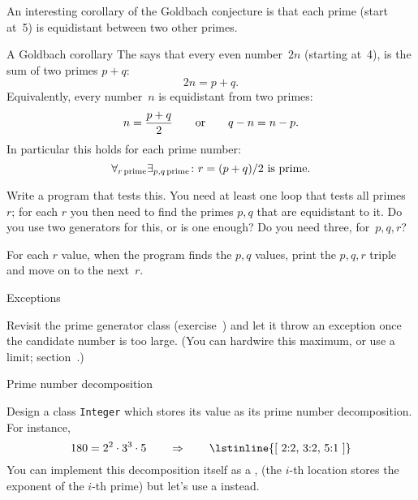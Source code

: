 An interesting corollary of the Goldbach conjecture is that
each prime (start at~5) is equidistant between two other primes.

\begin{block}{A Goldbach corollary}
  \label{sl:goldbach-pqr}
  The  says that every even number~$2n$
  (starting at~4), is the sum of two primes $p+q$: \[ 2n=p+q.\]
  Equivalently, every number~$n$ is equidistant from two primes:
  \[ n=\frac{p+q}2\qquad\hbox{or}\qquad q-n = n-p.\]
  In particular this holds for each prime number:
  \[ \forall_{r\,\mathrm{prime}}\exists_{p,q\,\mathrm{prime}}\colon
  \hbox{$r=(p+q)/2$ is prime}. \]
\end{block}

\begin{exercise}
  \label{ex:prime:goldbach-pqr}

  Write a program that tests this. You need at least one loop that
  tests all primes~$r$; for each $r$ you then need to find the primes
  $p,q$ that are equidistant to it. Do you use two generators for
  this, or is one enough? Do you need three, for~$p,q,r$?

  For each $r$ value, 
  when the program finds the $p,q$ values, print the $p,q,r$ triple and
  move on to the next~$r$.
\end{exercise}


 {Exceptions}


\begin{exercise}
  \label{ex:primegenbreak}
  Revisit the prime generator class (exercise~)
  and let it throw an exception once the candidate number is too large.
  (You can hardwire this maximum, or use a limit; section~.)

\end{exercise}

 {Prime number decomposition}
\label{sec:prime-decomp}


Design a class \lstinline{Integer} which stores its value
as its prime number decomposition. For instance,
\[ 180=2^2\cdot 3^3\cdot 5 \qquad \Rightarrow \qquad \hbox{\lstinline{[ 2:2, 3:2, 5:1 ]}} \]
You can implement this decomposition itself as a ,
(the $i$-th location stores the exponent of the $i$-th prime)
but let's use a  instead.

